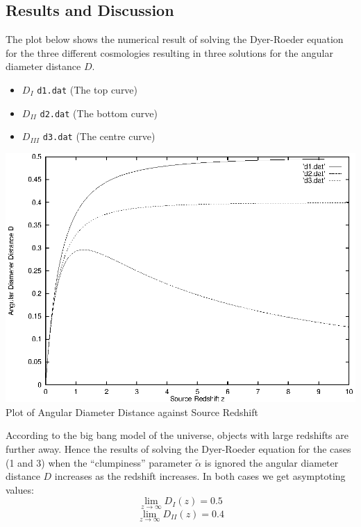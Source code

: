 \documentclass[a4paper]{IEEEtran}
\begin{document}
\subsection{Results and Discussion} 
The plot below shows the numerical result of solving the Dyer-Roeder
equation for the three different cosmologies resulting in three
solutions for the angular diameter distance $D$.
\begin{itemize}
    \item $D_{I}$   \texttt{d1.dat} (The top curve)
    \item $D_{II}$  \texttt{d2.dat} (The bottom curve)
    \item $D_{III}$ \texttt{d3.dat} (The centre curve)
\end{itemize}
\begin{center}
    \includegraphics[width=\columnwidth]{results/cosmo_all.eps}
    \\[1mm]
    Plot of Angular Diameter Distance against Source Redshift
\end{center}
According to the big bang model of the universe, objects with large
redshifts are further away. Hence the results of solving the Dyer-Roeder
equation for the cases (1 and 3) when the ``clumpiness'' parameter 
$\tilde{\alpha}$ is ignored the angular diameter distance $D$ increases
as the redshift increases. In both cases we get asymptoting values:
\begin{equation}
    \lim_{z \rightarrow \infty} D_{I}(z) = 0.5
\end{equation}
\begin{equation}
    \lim_{z \rightarrow \infty} D_{II}(z) = 0.4
\end{equation}
\end{document}
